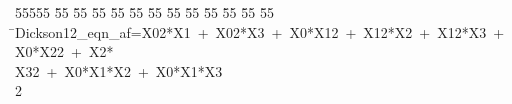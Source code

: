 %
%
\begin{tabbing}
55555 \= 55 \= 55 \= 55 \= 55 \= 55 \= 55 \= 55 \= 55 \= 55 \= 55 \= 55 \= 55 \= \>Dickson12\_eqn\_af=X02*X1\ +\ X02*X3\ +\ X0*X12\ +\ X12*X2\ +\ X12*X3\ +\ X0*X22\ +\ X2*\\[0pt]
\>X32\ +\ X0*X1*X2\ +\ X0*X1*X3\\[0pt]
2\>\end{tabbing}
